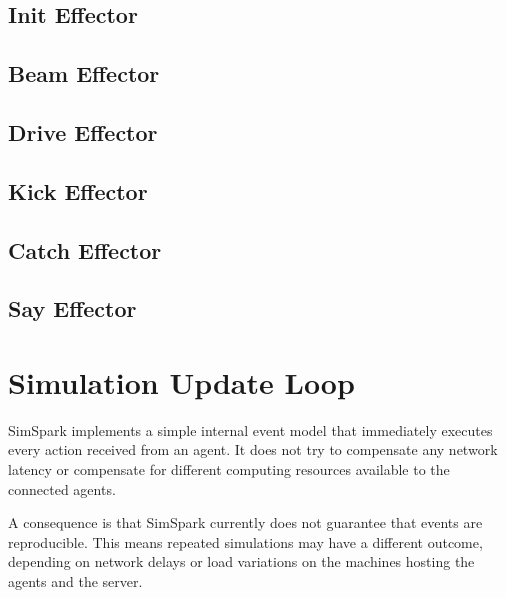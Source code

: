 
\subsection{Init Eﬀector}
\subsection{Beam Eﬀector}
\subsection{Drive Eﬀector}


\subsection{Kick Eﬀector}


\subsection{Catch Eﬀector}


\subsection{Say Eﬀector}

\section{Simulation Update Loop}


SimSpark implements a simple internal event model that immediately
executes every action received from an agent. It does not try to
compensate any network latency or compensate for different computing
resources available to the connected agents.

A consequence is that SimSpark currently does not guarantee that
events are reproducible. This means repeated simulations may have a
different outcome, depending on network delays or load variations on
the machines hosting the agents and the server.

